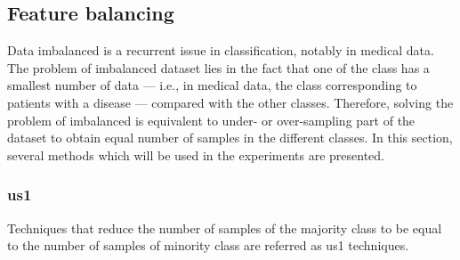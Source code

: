 \subsection{Feature balancing}\label{subsec:chp6:method:fea-bal}
Data imbalanced is a recurrent issue in classification, notably in medical data.
The problem of imbalanced dataset lies in the fact that one of the class has a smallest number of data --- i.e., in medical data, the class corresponding to patients with a disease --- compared with the other classes.
Therefore, solving the problem of imbalanced is equivalent to under- or over-sampling part of the dataset to obtain equal number of samples in the different classes.
In this section, several methods which will be used in the experiments are presented.

\subsubsection{\Acl*{us1}}
Techniques that reduce the number of samples of the majority class to be equal to the number of samples of minority class are referred as \ac{us1} techniques.

